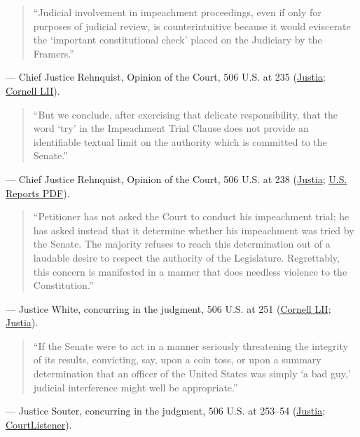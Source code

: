 \documentclass[12pt]{article}
\begin{document}
\begin{quote}
``Judicial involvement in impeachment proceedings, even if only for purposes of judicial review, is counterintuitive because it would eviscerate the `important constitutional check' placed on the Judiciary by the Framers.''
\end{quote}
\noindent--- Chief Justice Rehnquist, Opinion of the Court, 506 U.S. at 235 (\href{https://supreme.justia.com/cases/federal/us/506/224/}{Justia}; \href{https://www.law.cornell.edu/supct/html/91-740.ZO.html}{Cornell LII}).

\begin{quote}
``But we conclude, after exercising that delicate responsibility, that the word `try' in the Impeachment Trial Clause does not provide an identifiable textual limit on the authority which is committed to the Senate.''
\end{quote}
\noindent--- Chief Justice Rehnquist, Opinion of the Court, 506 U.S. at 238 (\href{https://supreme.justia.com/cases/federal/us/506/224/}{Justia}; \href{https://tile.loc.gov/storage-services/service/ll/usrep/usrep506/usrep506224/usrep506224.pdf}{U.S. Reports PDF}).

\begin{quote}
``Petitioner has not asked the Court to conduct his impeachment trial; he has asked instead that it determine whether his impeachment was tried by the Senate. The majority refuses to reach this determination out of a laudable desire to respect the authority of the Legislature. Regrettably, this concern is manifested in a manner that does needless violence to the Constitution.''
\end{quote}
\noindent--- Justice White, concurring in the judgment, 506 U.S. at 251 (\href{https://www.law.cornell.edu/supct/html/91-740.ZC1.html}{Cornell LII}; \href{https://supreme.justia.com/cases/federal/us/506/224/}{Justia}).

\begin{quote}
``If the Senate were to act in a manner seriously threatening the integrity of its results, convicting, say, upon a coin toss, or upon a summary determination that an officer of the United States was simply `a bad guy,' judicial interference might well be appropriate.''
\end{quote}
\noindent--- Justice Souter, concurring in the judgment, 506 U.S. at 253--54 (\href{https://supreme.justia.com/cases/federal/us/506/224/}{Justia}; \href{https://www.courtlistener.com/opinion/112803/nixon-v-united-states/}{CourtListener}).
\end{document}
